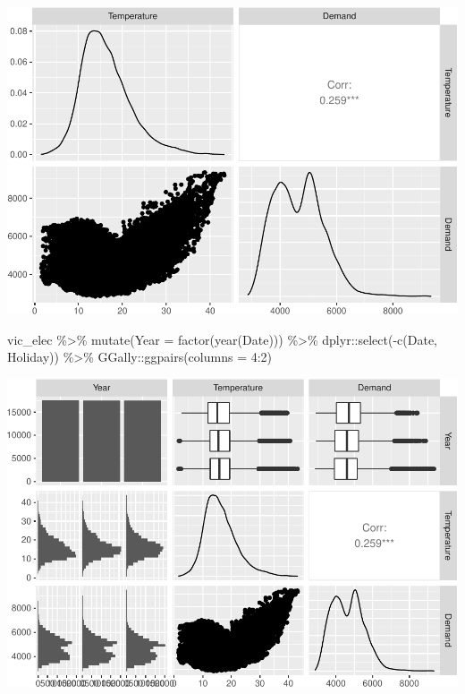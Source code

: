 \documentclass[
]{book}
\newenvironment{Shaded}{\begin{snugshade}}{\end{snugshade}}
\newcommand{\AttributeTok}[1]{\textcolor[rgb]{0.77,0.63,0.00}{#1}}
\newcommand{\DecValTok}[1]{\textcolor[rgb]{0.00,0.00,0.81}{#1}}
\newcommand{\FunctionTok}[1]{\textcolor[rgb]{0.00,0.00,0.00}{#1}}
\newcommand{\NormalTok}[1]{#1}
\newcommand{\SpecialCharTok}[1]{\textcolor[rgb]{0.00,0.00,0.00}{#1}}
\begin{document}
\includegraphics{graphics/unnamed-chunk-22-2.pdf}

\begin{Shaded}
\begin{Highlighting}[]
\NormalTok{vic\_elec }\SpecialCharTok{\%\textgreater{}\%}
  \FunctionTok{mutate}\NormalTok{(}\AttributeTok{Year =} \FunctionTok{factor}\NormalTok{(}\FunctionTok{year}\NormalTok{(Date))) }\SpecialCharTok{\%\textgreater{}\%}
\NormalTok{  dplyr}\SpecialCharTok{::}\FunctionTok{select}\NormalTok{(}\SpecialCharTok{{-}}\FunctionTok{c}\NormalTok{(Date, Holiday)) }\SpecialCharTok{\%\textgreater{}\%}
\NormalTok{  GGally}\SpecialCharTok{::}\FunctionTok{ggpairs}\NormalTok{(}\AttributeTok{columns =} \DecValTok{4}\SpecialCharTok{:}\DecValTok{2}\NormalTok{)}
\end{Highlighting}
\end{Shaded}

\includegraphics{graphics/unnamed-chunk-22-3.pdf}
\end{document}
